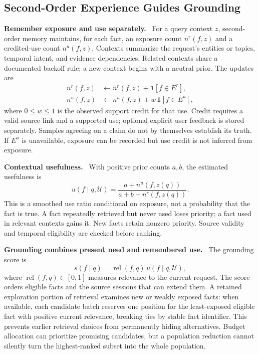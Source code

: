 \documentclass[10pt,twocolumn]{article}
\newcommand{\Uu}{\mathcal{U}}
\newcommand{\runin}[1]{\smallskip\noindent\textbf{#1.}\ }
\begin{document}
\subsection{Second-Order Experience Guides Grounding}
\label{subsec:new-experience}

\runin{Remember exposure and use separately}
For a query context $z$, second-order memory maintains, for each fact,
an exposure count $n^r(f,z)$ and a credited-use count $n^u(f,z)$.
Contexts summarize the request's entities or topics, temporal intent,
and evidence dependencies. Related contexts share a documented
backoff rule; a new context begins with a neutral prior. The updates are
\begin{align}
\label{eq:new-use-update}
n^r(f,z)&\leftarrow n^r(f,z)+\mathbf{1}[f\in E^r],\\
n^u(f,z)&\leftarrow n^u(f,z)+w\,\mathbf{1}[f\in E^u],
\end{align}
where $0\leq w\leq1$ is the observed support credit for that use.
Credit requires a valid source link and a supported use; optional
explicit user feedback is stored separately. Samples agreeing on a
claim do not by themselves establish its truth. If $E^u$ is unavailable,
exposure can be recorded but use credit is not inferred from exposure.

\runin{Contextual usefulness}
With positive prior counts $a,b$, the estimated usefulness is
\begin{equation}
\label{eq:new-usefulness}
u(f\mid q,\Uu)=
\frac{a+n^u(f,z(q))}{a+b+n^r(f,z(q))}.
\end{equation}
This is a smoothed use ratio conditional on exposure, not a probability
that the fact is true. A fact repeatedly retrieved but never used loses
priority; a fact used in relevant contexts gains it. New facts retain
nonzero priority. Source validity and temporal eligibility are checked
before ranking.

\runin{Grounding combines present need and remembered use}
The grounding score is
\begin{equation}
\label{eq:new-ranking}
s(f\mid q)=\operatorname{rel}(f,q)\,
                 u(f\mid q,\Uu),
\end{equation}
where $\operatorname{rel}(f,q)\in[0,1]$ measures relevance to the current
request. The score orders eligible facts and the source sessions that
can extend them. A retained exploration portion of retrieval examines
new or weakly exposed facts: when available, each candidate batch
reserves one position for the least-exposed eligible fact with positive
current relevance, breaking ties by stable fact identifier. This
prevents earlier retrieval choices from permanently hiding alternatives.
Budget allocation can prioritize
promising candidates, but a population reduction cannot silently turn
the highest-ranked subset into the whole population.
\end{document}
